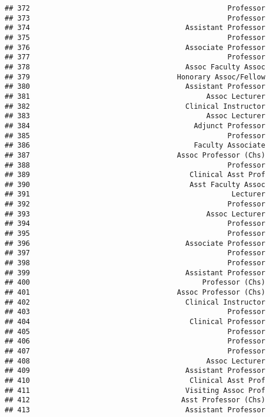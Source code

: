 \documentclass[
]{article}
\begin{document}
\begin{verbatim}
## 372                                               Professor
## 373                                               Professor
## 374                                     Assistant Professor
## 375                                               Professor
## 376                                     Associate Professor
## 377                                               Professor
## 378                                     Assoc Faculty Assoc
## 379                                   Honorary Assoc/Fellow
## 380                                     Assistant Professor
## 381                                          Assoc Lecturer
## 382                                     Clinical Instructor
## 383                                          Assoc Lecturer
## 384                                       Adjunct Professor
## 385                                               Professor
## 386                                       Faculty Associate
## 387                                   Assoc Professor (Chs)
## 388                                               Professor
## 389                                      Clinical Asst Prof
## 390                                      Asst Faculty Assoc
## 391                                                Lecturer
## 392                                               Professor
## 393                                          Assoc Lecturer
## 394                                               Professor
## 395                                               Professor
## 396                                     Associate Professor
## 397                                               Professor
## 398                                               Professor
## 399                                     Assistant Professor
## 400                                         Professor (Chs)
## 401                                   Assoc Professor (Chs)
## 402                                     Clinical Instructor
## 403                                               Professor
## 404                                      Clinical Professor
## 405                                               Professor
## 406                                               Professor
## 407                                               Professor
## 408                                          Assoc Lecturer
## 409                                     Assistant Professor
## 410                                      Clinical Asst Prof
## 411                                     Visiting Assoc Prof
## 412                                    Asst Professor (Chs)
## 413                                     Assistant Professor

\end{verbatim}
\end{document}
